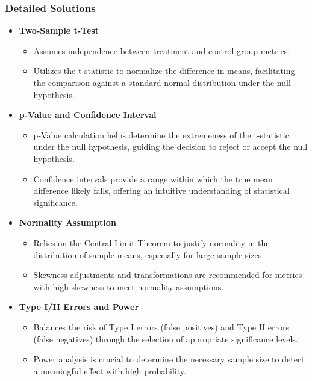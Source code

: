 \documentclass{article}
\begin{document}
\subsubsection*{Detailed Solutions}
\begin{itemize}
    \item \textbf{Two-Sample t-Test}
    \begin{itemize}
        \item Assumes independence between treatment and control group metrics.
        \item Utilizes the t-statistic to normalize the difference in means, facilitating the comparison against a standard normal distribution under the null hypothesis.
    \end{itemize}

    \item \textbf{p-Value and Confidence Interval}
    \begin{itemize}
        \item p-Value calculation helps determine the extremeness of the t-statistic under the null hypothesis, guiding the decision to reject or accept the null hypothesis.
        \item Confidence intervals provide a range within which the true mean difference likely falls, offering an intuitive understanding of statistical significance.
    \end{itemize}

    \item \textbf{Normality Assumption}
    \begin{itemize}
        \item Relies on the Central Limit Theorem to justify normality in the distribution of sample means, especially for large sample sizes.
        \item Skewness adjustments and transformations are recommended for metrics with high skewness to meet normality assumptions.
    \end{itemize}

    \item \textbf{Type I/II Errors and Power}
    \begin{itemize}
        \item Balances the risk of Type I errors (false positives) and Type II errors (false negatives) through the selection of appropriate significance levels.
        \item Power analysis is crucial to determine the necessary sample size to detect a meaningful effect with high probability.
    \end{itemize}


\end{itemize}
\end{document}
